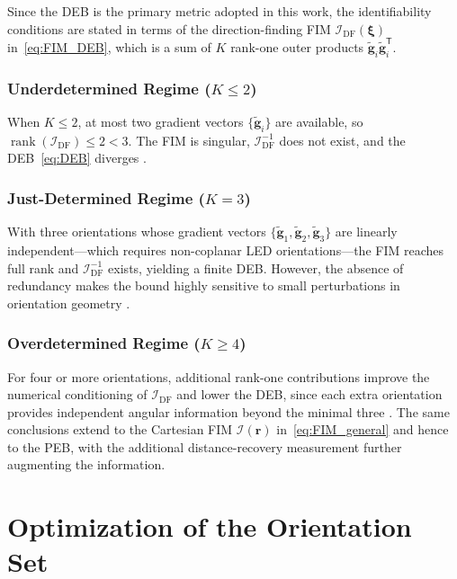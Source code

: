 \documentclass[journal]{IEEEtran}
\begin{document}
Since the DEB is the primary metric adopted in this work, the identifiability conditions are stated in terms of the direction-finding FIM $\mathcal{I}_{\mathrm{DF}}(\boldsymbol\xi)$ in~\eqref{eq:FIM_DEB}, which is a sum of $K$ rank-one outer products $\tilde{\mathbf g}_i\tilde{\mathbf g}_i^{\mathsf T}$.

\subsubsection{Underdetermined Regime ($K\le2$)}
When $K\le2$, at most two gradient vectors $\{\tilde{\mathbf g}_i\}$ are available, so $\operatorname{rank}(\mathcal{I}_{\mathrm{DF}})\le 2<3$. The FIM is singular, $\mathcal{I}_{\mathrm{DF}}^{-1}$ does not exist, and the DEB~\eqref{eq:DEB} diverges \cite{Zhuang2018}.

\subsubsection{Just-Determined Regime ($K=3$)}
With three orientations whose gradient vectors $\{\tilde{\mathbf g}_1,\tilde{\mathbf g}_2,\tilde{\mathbf g}_3\}$ are linearly independent---which requires non-coplanar LED orientations---the FIM reaches full rank and $\mathcal{I}_{\mathrm{DF}}^{-1}$ exists, yielding a finite DEB. However, the absence of redundancy makes the bound highly sensitive to small perturbations in orientation geometry \cite{Chen2021}.

\subsubsection{Overdetermined Regime ($K\ge4$)}
For four or more orientations, additional rank-one contributions improve the numerical conditioning of $\mathcal{I}_{\mathrm{DF}}$ and lower the DEB, since each extra orientation provides independent angular information beyond the minimal three \cite{Ma2024,Wang2024b}. The same conclusions extend to the Cartesian FIM $\mathcal{I}(\mathbf r)$ in~\eqref{eq:FIM_general} and hence to the PEB, with the additional distance-recovery measurement further augmenting the information. 


\section{Optimization of the Orientation Set}
\label{sec:optimization}
\end{document}
